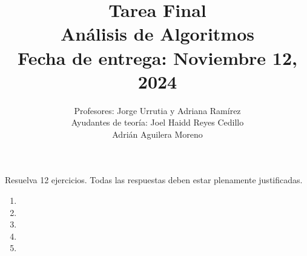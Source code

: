 \documentclass[11pt]{article}
\title{Tarea Final\\Análisis de Algoritmos\\ Fecha de entrega: Noviembre 12, 2024}
\author{Profesores: Jorge Urrutia y Adriana Ramírez \phantom{aa}\\ Ayudantes de teor\'ia: Joel Haidd Reyes Cedillo\\  \phantom{aaaaaaaaaaaaaaaaa} Adri\'an Aguilera Moreno \\}
\date{}
\begin{document}
\maketitle

\vspace{-15pt}
Resuelva 12 ejercicios. Todas las respuestas deben estar plenamente justificadas.


\textbf{}\vspace{.2cm}

\textcolor{bibi}{}
\begin{quote}
\end{quote}

\textbf{}\vspace{.2cm}

\textcolor{bibi}{}
\begin{quote}
\end{quote}


\textbf{}\vspace{.2cm}

\textcolor{bibi}{}
\begin{quote}
\end{quote}

\textbf{}\vspace{.2cm}

\textcolor{bibi}{}
\begin{quote}
\end{quote}

\textbf{}\vspace{.2cm}

\textcolor{bibi}{}
\begin{quote}
\end{quote}













\begin{enumerate}
    \begin{itemize}
        \item 

        \item 

        \item 
    \end{itemize}

    \item 

    \item 

    \item 
    
    
    
    
    

    

    \item 

    \item 
\end{enumerate}
\end{document}
